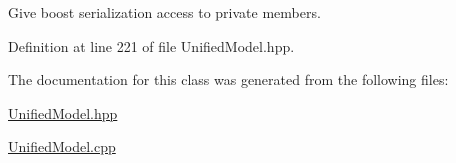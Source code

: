 Give boost serialization access to private members. 



Definition at line 221 of file Unified\+Model.\+hpp.



The documentation for this class was generated from the following files\+:\begin{DoxyCompactItemize}
\item 
\hyperlink{UnifiedModel_8hpp}{Unified\+Model.\+hpp}\item 
\hyperlink{UnifiedModel_8cpp}{Unified\+Model.\+cpp}\end{DoxyCompactItemize}
